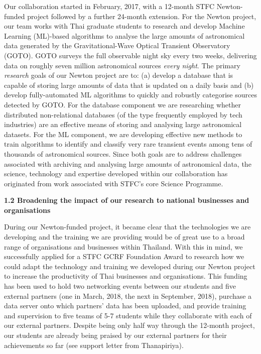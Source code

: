\documentclass[11pt]{article}
\begin{document}
  \vspace{2mm}
  \noindent
  Our collaboration started in February, 2017, with a 12-month STFC Newton-funded project followed by a further 24-month extension. For the Newton project, our team works with Thai graduate students to research and develop Machine Learning (ML)-based algorithms to analyse the large amounts of astronomical data generated by the Gravitational-Wave Optical Transient Observatory (GOTO). GOTO surveys the full observable night sky every two weeks, delivering data on roughly seven million astronomical sources {\it every night}. The primary {\it research} goals of our Newton project are to: (a) develop a database that is capable of storing large amounts of data that is updated on a daily basis and (b) develop fully-automated ML algorithms to quickly and robustly categorise sources detected by GOTO. For the database component we are researching whether distributed non-relational databases (of the type frequently employed by tech industries) are an effective means of storing and analysing large astronomical datasets. For the ML component, we are developing effective new methods to train algorithms to identify and classify very rare transient events among tens of thousands of astronomical sources. Since both goals are to address challenges associated with archiving and analysing large amounts of astronomical data, the science, technology and expertise developed within our collaboration has originated from work associated with STFC's core Science Programme. 
  
  \vspace{3mm}
  \noindent
  {\large \bf 1.2 Broadening the impact of our research to national businesses and organisations}
  
  \noindent
  During our Newton-funded project, it became clear that the technologies we are developing and the training we are providing would be of great use to a broad range of organisations and businesses within Thailand. With this in mind, we successfully applied for a STFC GCRF Foundation Award to research how we could adapt the technology and training we developed during our Newton project to increase the productivity of Thai businesses and organisations. This funding has been used to hold two networking events between our students and five external partners (one in March, 2018, the next in September, 2018), purchase a data server onto which partners' data has been uploaded, and provide training and supervision to five teams of 5-7 students while they collaborate with each of our external partners. Despite being only half way through the 12-month project, our students are already being praised by our external partners for their achievements so far (see support letter from Thanapiriya).
  
\end{document}
